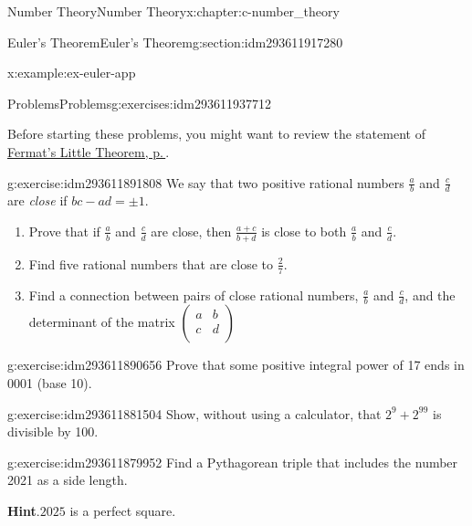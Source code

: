 \documentclass[twoside,10pt,]{book}
\newcommand{\blocktitlefont}{\relax}
\numberwithin{equation}{section}
\begin{document}
\begin{chapterptx}{Number Theory}{}{Number Theory}{}{}{x:chapter:c-number_theory}
\begin{sectionptx}{Euler's Theorem}{}{Euler's Theorem}{}{}{g:section:idm293611917280}
\begin{example}{}{x:example:ex-euler-app}
\end{example}
\end{sectionptx}
%
%
\typeout{************************************************}
\typeout{************************************************}
%
\begin{exercises-section}{Problems}{}{Problems}{}{}{g:exercises:idm293611937712}
\begin{introduction}{}%
Before starting these problems, you might want to review the statement of \hyperref[x:theorem:theorem-fermat-little]{Fermat's Little Theorem, p.\,\pageref{x:theorem:theorem-fermat-little}}.%
\end{introduction}%
\begin{divisionexercise}{1}{}{}{g:exercise:idm293611891808}%
We say that two positive rational numbers \(\frac{a}{b}\) and \(\frac{c}{d}\) are \emph{close} if \(b c - ad = \pm 1\).%
\begin{enumerate}[label=(\alph*)]
\item{}Prove that if \(\frac{a}{b}\) and \(\frac{c}{d}\) are close, then \(\frac{a+c}{b+d}\) is close to both \(\frac{a}{b}\) and \(\frac{c}{d}\).%
\item{}Find five rational numbers that are close to \(\frac{2}{7}\).%
\item{}Find a connection between pairs of close rational numbers, \(\frac{a}{b}\) and \(\frac{c}{d}\), and  the determinant of the matrix \(\left(
\begin{array}{cc}
a  &  b   \\
c  &  d   \\
\end{array}
\right)\)%
\end{enumerate}
%
\end{divisionexercise}%
\begin{divisionexercise}{2}{}{}{g:exercise:idm293611890656}%
Prove that some positive integral power of 17 ends in 0001 (base 10).%
\end{divisionexercise}%
\begin{divisionexercise}{3}{}{}{g:exercise:idm293611881504}%
Show, without using a calculator, that \(2^9 + 2^{99}\) is divisible by 100.%
\end{divisionexercise}%
\begin{divisionexercise}{4}{}{}{g:exercise:idm293611879952}%
Find a Pythagorean triple that includes the number 2021 as a side length.%
\par\smallskip%
\noindent\textbf{\blocktitlefont Hint}.\label{g:hint:idm293611878608}{}\hypertarget{g:hint:idm293611878608}{}\quad{}\(2025\) is a perfect square.%

\end{divisionexercise}
\end{exercises-section}
\end{chapterptx}
\end{document}
